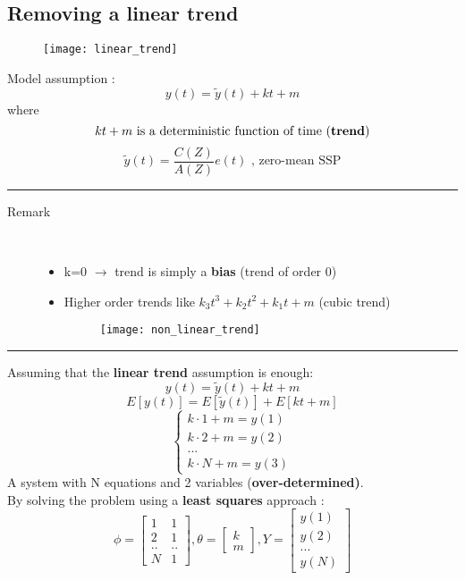 \subsection{Removing a linear trend}
\begin{figure}[H]
 \centering
  \texttt{[image: linear\_trend]}
\end{figure}
Model assumption : 
$$ y(t) = \tilde{y}(t) + kt+m$$
where
$$kt+m \text{ is a deterministic function of time (\textbf{trend})}$$
$$\tilde{y}(t) = \frac{C(Z)}{A(Z)}e(t) \text{ , zero-mean SSP}$$
\par\noindent\rule{\textwidth}{0.4pt}
\begin{description}
\item [Remark]\hfill\\
\begin{itemize}
\item k=0 $\to$ trend is simply a \textbf{bias} (trend of order 0)
\item Higher order trends like $k_3t^3+k_2t^2+k_1t+m$ (cubic trend)
\begin{figure}[H]
 \centering
  \texttt{[image: non\_linear\_trend]}
\end{figure}
\end{itemize}
\end{description}
\par\noindent\rule{\textwidth}{0.4pt}
Assuming that the \textbf{linear trend} assumption is enough:
$$ y(t) = \tilde{y}(t) + kt+m$$
$$ E[y(t)] = E[\tilde{y}(t)] + E[kt+m]$$
$$ \begin{cases} 
	k \cdot 1 + m =y(1) \\ 
	k \cdot 2 + m =y(2) \\ 
	... \\
	k \cdot N + m =y(3)
	\end{cases}
$$
A system with N equations and 2 variables (\textbf{over-determined)}.\\
By solving the problem using a \textbf{least squares } approach :
$$\phi = \begin{bmatrix} 1 & 1 \\ 2 & 1 \\ .. & ..\\ N & 1 \end{bmatrix} , \theta=\begin{bmatrix} k \\ m \end{bmatrix}, Y = \begin{bmatrix} y(1) \\ y(2) \\ ... \\ y(N) \end{bmatrix}$$
